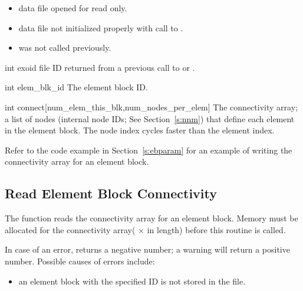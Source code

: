 \begin{itemize}
 \item data file opened for read only.

 \item data file not initialized properly with call to .

 \item {} was not called previously.
\end{itemize}


\begin{parameters}
\item[{int exoid \R{}}]
\exo{} file ID returned from a previous call to  
or .

\item[{int elem_blk_id \R{}}]
The element block ID.

\item[{int connect[num_elem_this_blk,num_nodes_per_elem] \R{}}]
The connectivity array; a list of nodes (internal node IDs; 
See Section~\ref{s:nnm}) that define each element in the element
block. The node index cycles faster than the element index.
\end{parameters}

Refer to the code example in Section~\ref{s:ebparam} for an example of
writing the connectivity array for an element block.


\subsection{Read Element Block Connectivity}

The function  reads the connectivity array
for an element block. Memory must be allocated for the connectivity
array( $\times$  in length)
before this routine is called.

In case of an error,  returns a 
negative number; a warning will return a positive number. 
Possible causes of errors include:
\begin{itemize}
 \item an element block with the specified ID is not stored in the
 file.
\end{itemize}



